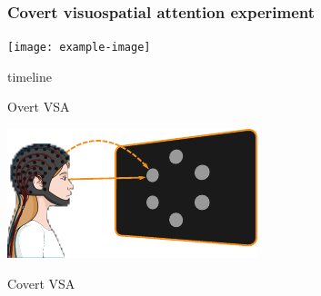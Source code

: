 \documentclass{kul-ulille-beamer}
\begin{document}


\begin{frame}
  \frametitle{Covert visuospatial attention experiment}

  \begin{minipage}{.6\textwidth}
    \centering

    \begin{minipage}[t]{.45\textwidth}
    
    \end{minipage}\hfill%
    \begin{minipage}[t]{.45\textwidth}
      \texttt{[image: example-image]}

      timeline
    \end{minipage}
    \bigskip
    \bigskip
    \bigskip


    {\small
    \begin{minipage}{.3\textwidth}
      Overt VSA
      \smallskip

      \includegraphics[width=\textwidth]{figures/covert/attention_overt.pdf}
    \end{minipage}\hfill%
    \begin{minipage}{.3\textwidth}
      Covert VSA
      \smallskip


\end{minipage}}
\end{minipage}
\end{frame}
\end{document}
